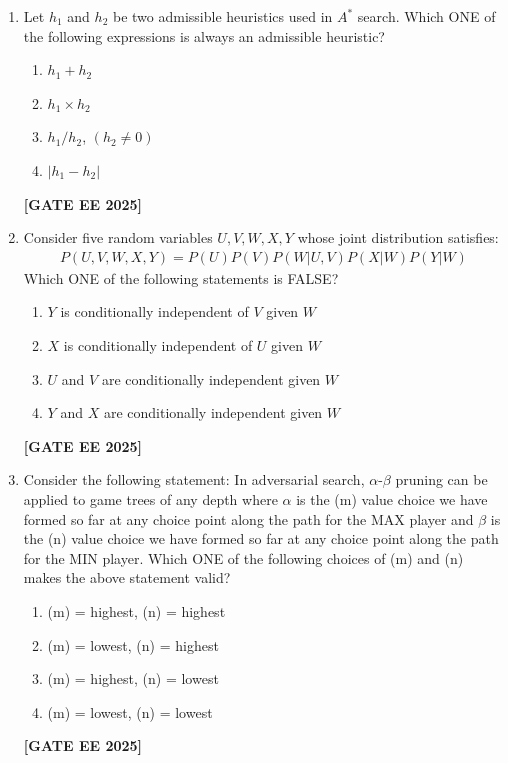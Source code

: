 \documentclass[journal]{IEEEtran}
\newcommand{\qfooter}{%
  \begin{flushright}\footnotesize\textbf{[GATE EE 2025]}\end{flushright}\vspace{1em}%
}
\begin{document}
\begin{enumerate}
\item Let $h_1$ and $h_2$ be two admissible heuristics used in $A^*$ search. Which ONE of the following expressions is always an admissible heuristic?
\begin{multicols}{2}
\begin{enumerate}
\item $h_1 + h_2$
\item $h_1 \times h_2$
\item $h_1 / h_2$, $(h_2 \neq 0)$
\item $| h_1 - h_2 |$
\end{enumerate} \qfooter
\end{multicols}

\item Consider five random variables $U, V, W, X, Y$ whose joint distribution satisfies:
\begin{align}
P(U, V, W, X, Y) = P(U)P(V)P(W|U,V)P(X|W)P(Y|W)
\end{align}
Which ONE of the following statements is FALSE?
\begin{multicols}{2}
\begin{enumerate}
\item $Y$ is conditionally independent of $V$ given $W$
\item $X$ is conditionally independent of $U$ given $W$
\item $U$ and $V$ are conditionally independent given $W$
\item $Y$ and $X$ are conditionally independent given $W$
\end{enumerate} \qfooter
\end{multicols}

\item Consider the following statement: In adversarial search, $\alpha$-$\beta$ pruning can be applied to game trees of any depth where $\alpha$ is the (m) value choice we have formed so far at any choice point along the path for the MAX player and $\beta$ is the (n) value choice we have formed so far at any choice point along the path for the MIN player. Which ONE of the following choices of (m) and (n) makes the above statement valid?
\begin{multicols}{2}
\begin{enumerate}
\item (m) = highest, (n) = highest
\item (m) = lowest, (n) = highest
\item (m) = highest, (n) = lowest
\item (m) = lowest, (n) = lowest
\end{enumerate} \qfooter
\end{multicols}


\end{enumerate}
\end{document}
